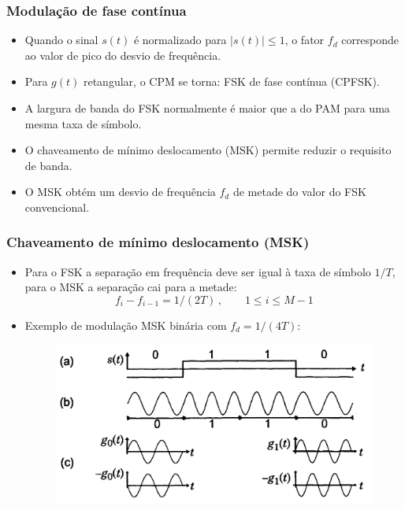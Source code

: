 \begin{frame}
	\frametitle{Modulação de fase contínua}

	\begin{itemize}
	    \item Quando o sinal $s(t)$ é normalizado para $|s(t)|\leq 1$, o fator $f_d$ corresponde ao valor de pico do desvio de frequência.
	    \item Para $g(t)$ retangular, o CPM se torna: FSK de fase contínua (CPFSK).
	    \item A largura de banda do FSK normalmente é maior que a do PAM para uma mesma taxa de símbolo.
	    \item O chaveamento de mínimo deslocamento (MSK) permite reduzir o requisito de banda.
	    \item O MSK obtém um desvio de frequência $f_d$ de metade do valor do FSK convencional.
	\end{itemize}	
\end{frame}

\begin{frame}
	\frametitle{Chaveamento de mínimo deslocamento (MSK)}

	\begin{itemize}
	    \item Para o FSK a separação em frequência deve ser igual à taxa de símbolo $1/T$, para o MSK a separação cai para a metade:
	    \begin{equation*}
		f_i - f_{i-1} = 1/(2T) \, , \qquad 1 \leq i \leq M-1
	    \end{equation*}
	    \item Exemplo de modulação MSK binária com $f_d = 1/(4T)$:
	    \begin{figure}[t]	
		\begin{center}
		\includegraphics[width=0.6\columnwidth]{figs/adv_25}
		\end{center}
	    \end{figure}
	\end{itemize}	
\end{frame}

